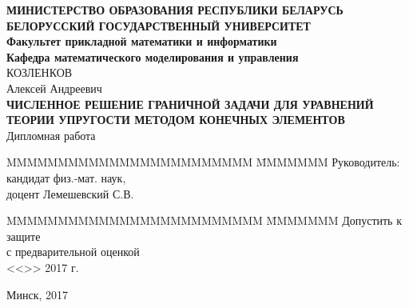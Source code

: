 \documentclass[a4paper, 14pt]{extreport}
\begin{document}
\renewcommand{\figurename}{Рисунок} %
\renewcommand{\contentsname}{\hfill\Large ОГЛАВЛЕНИЕ \hfill}
\renewcommand{\cftaftertoctitle}{\hfill}




\begin{titlepage}
    \begin{center}
        \normalsize {\bf МИНИСТЕРСТВО ОБРАЗОВАНИЯ РЕСПУБЛИКИ БЕЛАРУСЬ} \\
        \vspace{0.5cm}
        \normalsize {\bf БЕЛОРУССКИЙ ГОСУДАРСТВЕННЫЙ УНИВЕРСИТЕТ} \\
        \vspace{0.5cm}
        \normalsize {\bf Факультет прикладной математики и информатики} \\
        \vspace{0.5cm}
        \normalsize {\bf Кафедра математического моделирования и управления} \\
        \vspace{2cm}
        КОЗЛЕНКОВ \\
        Алексей Андреевич \\
        \vspace{1cm}
        \normalsize {\bf ЧИСЛЕННОЕ РЕШЕНИЕ ГРАНИЧНОЙ ЗАДАЧИ ДЛЯ УРАВНЕНИЙ ТЕОРИИ УПРУГОСТИ МЕТОДОМ
        КОНЕЧНЫХ ЭЛЕМЕНТОВ}\\
        \vspace{1cm}
        \normalsize Дипломная работа \\
        \vspace{2cm}
        \begin{tabbing}
            MMMMMMMMMMMMMMMMMMMMMMMM \= MMMMMMM \kill
            \> Руководитель: \\
            \>  кандидат физ.-мат. наук, \\
            \> доцент Лемешевский С.В. 
        \end{tabbing}
        \begin{tabbing}
            MMMMMMMMMMMMMMMMMMMMMMMMM \= MMMMMMM \kill
            Допустить к защите \>  \\
            с предварительной оценкой \underline{\hspace{0.5cm}} \\
            <<\underline{\hspace{1cm}}>> \underline{\hspace{3.3cm}} 2017 г.
        \end{tabbing}

        \vspace{2cm}

        \large Минск, 2017
    \end{center}
    
\end{titlepage}
\end{document}
